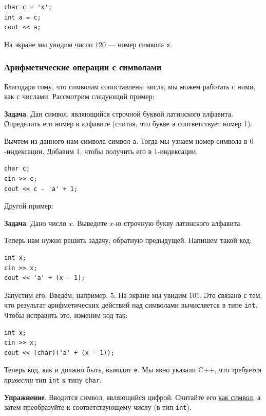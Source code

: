 \documentclass{article}
\newcommand{\task}[1]{\textbf{Задача}. #1}
\newcommand{\exercise}[1]{\textbf{Упражнение}. #1}
\begin{document}
	\begin{lstlisting}
char c = 'x';
int a = c;
cout << a;
	\end{lstlisting}
	
	На экране мы увидим число $120$ --- номер символа \texttt{x}.
	
	\subsubsection{Арифметические операции с символами}
	
	Благодаря тому, что символам сопоставлены числа, мы можем работать с ними, как с числами. Рассмотрим следующий пример:
	
	\task{Дан символ, являющийся строчной буквой латинского алфавита. Определить его номер в алфавите (считая, что букве \texttt{a} соответствует номер 1).}
	
	Вычтем из данного нам символа символ \texttt{a}. Тогда мы узнаем номер символа в $0$-индексации. Добавим 1, чтобы получить его в $1$-индексации.
	
	\begin{lstlisting}
char c;
cin >> c;
cout << c - 'a' + 1;
	\end{lstlisting}
	
	Другой пример:
	
	\task{Дано число $x$. Выведите $x$-ю строчную букву латинского алфавита.}
	
	Теперь нам нужно решить задачу, обратную предыдущей. Напишем такой код:
	
	\begin{lstlisting}
int x;
cin >> x;
cout << 'a' + (x - 1);
	\end{lstlisting}
	
	Запустим его. Введём, например, $5$. На экране мы увидим $101$. Это связано с тем, что результат арифметических действий над символами вычисляется в типе \texttt{int}. Чтобы исправить это, изменим код так:
	
	\begin{lstlisting}
int x;
cin >> x;
cout << (char)('a' + (x - 1));
	\end{lstlisting}
	
	Теперь код, как и должно быть, выводит \texttt{e}. Мы явно указали C++, что требуется \textit{привести} тип \texttt{int} к типу \texttt{char}.
	
	\exercise{Вводится символ, являющийся цифрой. Считайте его \underline{как символ}, а затем преобразуйте к соответствующему числу (в тип \texttt{int}).}
	
\end{document}
